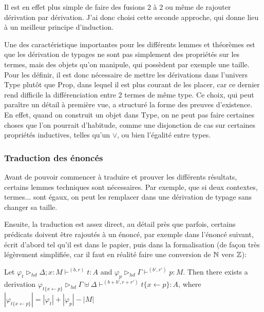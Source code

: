 \documentclass[10pt]{article}
\begin{document}
Il est en effet plus simple de faire des fusions 2 à 2 ou même de rajouter dérivation par dérivation. J'ai donc choisi cette seconde approche, qui donne lieu à un meilleur principe d'induction.

Une des caractéristique importantes pour les différents lemmes et théorèmes est que les dérivation de typages ne sont pas simplement des propriétés sur les termes, mais des objets qu'on manipule, qui possèdent par exemple une taille. Pour les définir, il est donc nécessaire de mettre les dérivations dans l'univers \textsf{Type} plutôt que \textsf{Prop}, dans lequel il est plus courant de les placer, car ce dernier rend difficile la différenciation entre 2 termes de même type. Ce choix, qui peut paraître un détail à première vue, a structuré la forme des preuves d'existence. En effet, quand on construit un objet dans Type, on ne peut pas faire certaines choses que l'on pourrait d'habitude, comme une disjonction de cas sur certaines propriétés inductives, telles qu'un $\lor$, ou bien l'égalité entre types.

\subsubsection{Traduction des énoncés}
Avant de pouvoir commencer à traduire et prouver les différents résultats, certains lemmes techniques sont nécessaires. Par exemple, que si deux contextes, termes... sont égaux, on peut les remplacer dans une dérivation de typage sans changer sa taille.

Ensuite, la traduction est assez direct, au détail près que parfois, certains prédicats doivent être rajoutés à un énoncé, par exemple dans l'énoncé suivant, écrit d'abord tel qu'il est dans le papier, puis dans la formalisation (de façon très légèrement simplifiée, car il faut en réalité faire une conversion de $\mathbb{N}$ vers $\mathbb{Z}$):

  Let $\varphi_t\triangleright_{hd} \Delta; x : M \vdash^{(b, r)} t : A$ and $\varphi_p\triangleright_{hd} \Gamma \vdash^{(b', r')} p : M$. Then there exists a derivation $\varphi_{t\{x \leftarrow p\}}\triangleright_{hd} \Gamma \uplus \Delta \vdash^{(b + b', r + r')} t\{x \leftarrow p\} : A$, where $|\varphi_{t\{x \leftarrow p\}}| = |\varphi_t| + |\varphi_p| - |M|$
\end{document}
